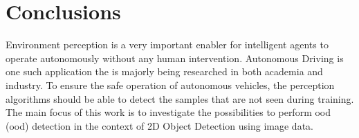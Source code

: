

    \justifying
    \chapter{Conclusions}
    Environment perception is a very important enabler for intelligent agents to operate autonomously without any human intervention. Autonomous Driving is one such application the is majorly being researched in both academia and industry. To ensure the safe operation of autonomous vehicles, the perception algorithms should be able to detect the samples that are not seen during training. The main focus of this work is to investigate the possibilities to perform \acrlong{ood} (\acrshort{ood}) detection in the context of 2D Object Detection using image data. 
    
